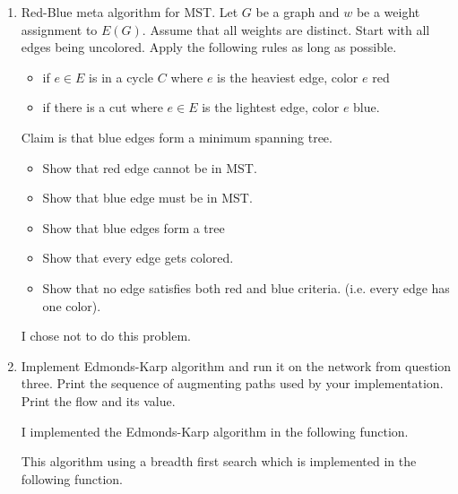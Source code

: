 \documentclass[11pt, oneside]{article}
\begin{document}
\begin{enumerate}
  \item %
    Red-Blue meta algorithm for MST.
    Let $G$ be a graph and $w$ be a weight assignment to $E(G)$.
    Assume that all weights are distinct.
    Start with all edges being uncolored.
    Apply the following rules as long as possible.
    \begin{itemize}
      \item if $e \in E$ is in a cycle $C$ where $e$ is the heaviest edge, color $e$ red
      \item if there is a cut where $e\in E$ is the lightest edge, color $e$ blue.
    \end{itemize}
    Claim is that blue edges form a minimum spanning tree.
    \begin{itemize}
      \item Show that red edge cannot be in MST.
      \item Show that blue edge must be in MST.
      \item Show that blue edges form a tree
      \item Show that every edge gets colored.
      \item Show that no edge satisfies both red and blue criteria. (i.e. every edge has one color).
    \end{itemize}
    
    I chose not to do this problem.

  \item %
    Implement Edmonds-Karp algorithm and run it on the network from question three.
    Print the sequence of augmenting paths used by your implementation.
    Print the flow and its value.

    I implemented the Edmonds-Karp algorithm in the following function.
    

    This algorithm using a breadth first search which is implemented in the
    following function.
    


\end{enumerate}
\end{document}
